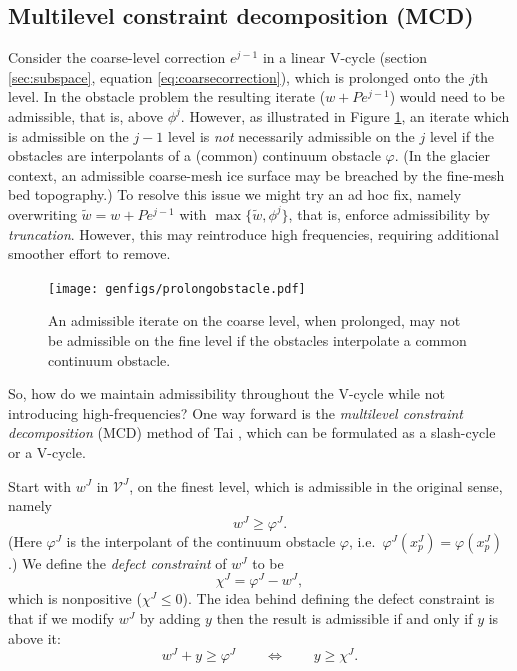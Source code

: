 \documentclass[letterpaper,final,12pt,reqno]{amsart}
\theoremstyle{claim}
\numberwithin{equation}{section}
\numberwithin{figure}{section}
\numberwithin{table}{section}
\numberwithin{theorem}{section}
\begin{document}
\subsection*{Multilevel constraint decomposition (MCD)}  Consider the coarse-level correction $e^{j-1}$ in a linear V-cycle (section \ref{sec:subspace}, equation \eqref{eq:coarsecorrection}), which is prolonged onto the $j$th level.  In the obstacle problem the resulting iterate ($w+Pe^{j-1}$) would need to be admissible, that is, above $\phi^j$.  However, as illustrated in Figure \ref{fig:prolongobstacle}, an iterate which is admissible on the $j-1$ level is \emph{not} necessarily admissible on the $j$ level if the obstacles are interpolants of a (common) continuum obstacle $\varphi$.  (In the glacier context, an admissible coarse-mesh ice surface may be breached by the fine-mesh bed topography.)  To resolve this issue we might try an ad hoc fix, namely overwriting $\tilde w = w+Pe^{j-1}$ with $\max\{\tilde w,\phi^j\}$, that is, enforce admissibility by \emph{truncation}.  However, this may reintroduce high frequencies, requiring additional smoother effort to remove.

\begin{figure}
\qquad \texttt{[image: genfigs/prolongobstacle.pdf]}
\caption{An admissible iterate on the coarse level, when prolonged, may not be admissible on the fine level if the obstacles interpolate a common continuum obstacle.}
\label{fig:prolongobstacle}
\end{figure}

So, how do we maintain admissibility throughout the V-cycle while not introducing high-frequencies?  One way forward is the \emph{multilevel constraint decomposition} (MCD) method of Tai \cite{Tai2003}, which can be formulated as a slash-cycle \cite[Algorithm 4.7]{GraeserKornhuber2009} or a V-cycle.

Start with $w^J$ in $\mathcal{V}^J$, on the finest level, which is admissible in the original sense, namely
\begin{equation}
  w^J \ge \varphi^J. \label{eq:fineadmissibleiterate}
\end{equation}
(Here $\varphi^J$ is the interpolant of the continuum obstacle $\varphi$, i.e.~$\varphi^J(x_p^J)=\varphi(x_p^J)$.)  We define the \emph{defect constraint} \cite{GraeserKornhuber2009} of $w^J$ to be
\begin{equation}
  \chi^J = \varphi^J - w^J,  \label{eq:defectconstraint}
\end{equation}
which is nonpositive ($\chi^J\le 0$).  The idea behind defining the defect constraint is that if we modify $w^J$ by adding $y$ then the result is admissible if and only if $y$ is above it:
\begin{equation}
  w^J + y \ge \varphi^J  \qquad \iff \qquad y \ge \chi^J.  \label{eq:defectmeaning}
\end{equation}
\end{document}
